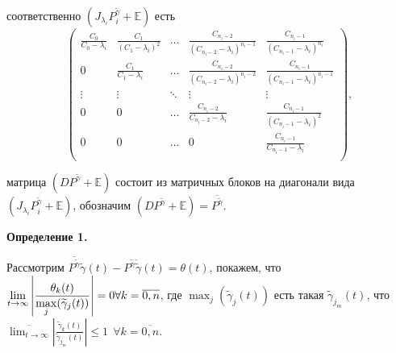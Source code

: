 \documentclass[12pt, a4paper]{article}
\begin{document}
соответственно $\left(J_{\lambda_i} P_i^{\widetilde{\gamma}} + \mathds{E}\right)$ есть
\[
\left(
\begin{array}{ccccc}
\displaystyle\frac{C_0}{C_0-\lambda_i} & \displaystyle\frac{C_1}{(C_1-\lambda_i)^2} & \dots & \displaystyle\frac{C_{n_i-2}}{(C_{n_i-2}-\lambda_i)^{n_i-1}} & \displaystyle\frac{C_{n_i-1}}{(C_{n_i-1}-\lambda_i)^{n_i}} \\
0 & \displaystyle\frac{C_1}{C_1-\lambda_i} & \dots & \displaystyle\frac{C_{n_i-2}}{(C_{n_i-2}-\lambda_i)^{n_i-2}} & \displaystyle\frac{C_{n_i-1}}{(C_{n_i-1}-\lambda_i)^{n_i-1}} \\
\vdots & \vdots & \ddots & \vdots & \vdots\\
0 & 0 & \dots & \displaystyle\frac{C_{n_i-2}}{C_{n_i-2}-\lambda_i} & \displaystyle\frac{C_{n_i-1}}{(C_{n_i-1}-\lambda_i)^2} \\
0 & 0 & \dots & 0 & \displaystyle\frac{C_{n_i-1}}{C_{n_i-1}-\lambda_i} \\
\end{array}
\right),
\]

матрица $\left(DP^{\widetilde{\gamma}} + \mathds{E}\right)$ состоит из матричных блоков на диагонали вида 
$\left(J_{\lambda_i} P_i^{\widetilde{\gamma}} + \mathds{E}\right)$, обозначим $\left(DP^{\widetilde{\gamma}} + \mathds{E}\right) = \overline{P^{\widetilde{\gamma}}}$. 

\quad \textbf{Определение 1.}

\quad Рассмотрим $\overline{P^{\widetilde{\gamma}}}\widetilde{\gamma}(t) - P^{\widetilde{\gamma}}\dot{\widetilde{\gamma}}(t) = \theta(t)$, покажем, что $\displaystyle\lim_{t \rightarrow \infty}\left|\frac{\theta_k(t)}{\displaystyle\max_j(\widetilde{\gamma}_j(t))}\right| = 0 \\ \forall k=\overline{0, n}$, где $\displaystyle\max_j(\widetilde{\gamma}_j(t))$ есть такая $\widetilde{\gamma}_{j_m}(t)$, что $\displaystyle \overline{\lim_{t \rightarrow \infty}}\left|\frac{\widetilde{\gamma}_k(t)}{\widetilde{\gamma}_{j_m}(t)}\right| \leq 1 \:\: \forall k=\overline{0, n}$.
\end{document}
